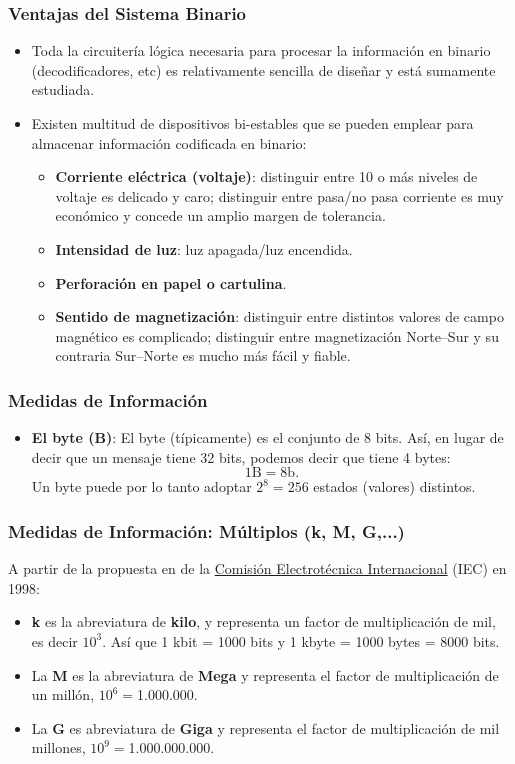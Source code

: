 \documentclass{beamer}
\begin{document}
\begin{frame}[fragile]\frametitle{Ventajas del Sistema Binario}
\begin{itemize}
	\item Toda la circuitería lógica necesaria para procesar la información en binario (decodificadores, etc) es relativamente sencilla de diseñar y está sumamente estudiada.

\item Existen multitud de dispositivos bi-estables que se pueden emplear para almacenar información codificada en binario:
\begin{itemize}
	\item \textbf{Corriente eléctrica (voltaje)}: distinguir entre 10 o más niveles de voltaje es delicado y caro; distinguir entre pasa/no pasa corriente es muy económico y concede un amplio margen de tolerancia.
	\item \textbf{Intensidad de luz}: luz apagada/luz encendida.
	\item \textbf{Perforación en papel o cartulina}.
	\item \textbf{Sentido de magnetización}: distinguir entre distintos valores de campo magnético es complicado; distinguir entre magnetización Norte--Sur y su contraria Sur--Norte es mucho más fácil y fiable.
\end{itemize}
\end{itemize}
\end{frame}


\begin{frame}[fragile]\frametitle{Medidas de Información}
\begin{itemize}
\item \textbf{El byte (B)}: El byte (típicamente) es el conjunto de 8 bits. Así, en lugar de decir que un mensaje tiene 32 bits, podemos decir que tiene 4 bytes:
$$
1 \text{B} = 8 \text{b}.
$$
Un byte puede por lo tanto adoptar $2^8=256$ estados (valores) distintos. 
\end{itemize}
\end{frame}


\begin{frame}[fragile]\frametitle{Medidas de Información: Múltiplos (k, M, G,...)}
A partir de la propuesta en de la \href{https://es.wikipedia.org/wiki/Comisi%C3%B3n_Electrot%C3%A9cnica_Internacional}{Comisi\'on Electrot\'ecnica Internacional} (IEC) en 1998:
\begin{itemize}
	\item \textbf{k} es la abreviatura de \textbf{kilo}, y representa un factor de multiplicación de mil, es decir $10^3$. Así que 1 kbit = 1000 bits y 1 kbyte = 1000 bytes = 8000 bits. 
	
	\item La \textbf{M} es la abreviatura de \textbf{Mega} y representa el factor de multiplicación de un mill\'on, $10^{6}= $1.000.000.
	
	\item La \textbf{G} es abreviatura de \textbf{Giga} y representa el factor de multiplicación de mil millones, $10^{9} = $1.000.000.000.
\end{itemize}
\end{frame}
\end{document}
